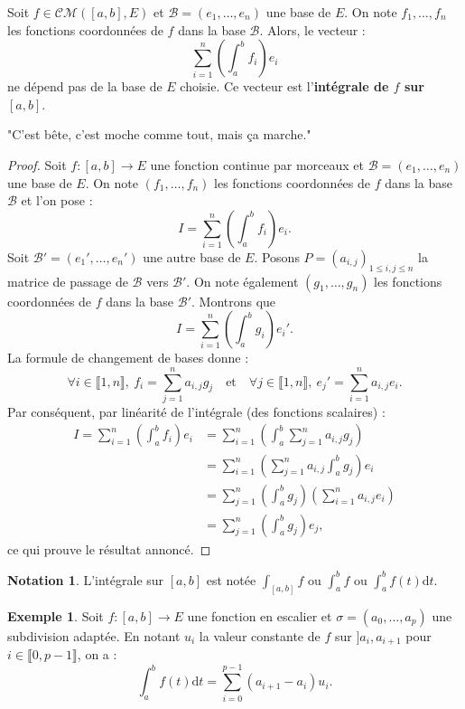 \documentclass[french]{article}
\renewcommand{\d}{\text{d}}
\theoremstyle{plain}
\theoremstyle{definition}
\newtheorem*{ex}{Exemple}
\newtheorem*{notation}{Notation}
\theoremstyle{remark}
\begin{document}
\begin{prop}%
	Soit $f\in\mathcal{CM}([a,b],E)$ et $\mathcal{B}=(e_1,\ldots,e_n)$ une base de $E$. On note $f_1,\ldots,f_n$ les fonctions coordonnées de $f$ dans la base $\mathcal{B}$. Alors, le vecteur :
	$$\sum_{i=1}^{n}\left(\int_{a}^{b}f_i\right)e_i$$ ne dépend pas de la base de $E$ choisie. Ce vecteur est l'\textbf{intégrale de $f$ sur $[a,b]$}.
\end{prop}
"C'est bête, c'est moche comme tout, mais ça marche."
\begin{proof}
	Soit $f:[a,b]\to E$ une fonction continue par morceaux et $\mathcal{B}=(e_1,\ldots,e_n)$ une base de $E$. On note $(f_1,\ldots,f_n)$ les fonctions coordonnées de $f$ dans la base $\mathcal{B}$ et l'on pose :
	$$I=\sum_{i=1}^{n}\left(\int_{a}^{b}f_i\right)e_i.$$
	Soit $\mathcal{B}'=(e_1',\ldots,e_n')$ une autre base de $E$. Posons $P=(a_{i,j})_{1\leqslant i,j\leqslant n}$ la matrice de passage de $\mathcal{B}$ vers $\mathcal{B}'$. On note également $(g_1,\ldots,g_n)$ les fonctions coordonnées de $f$ dans la base $\mathcal{B}'$. Montrons que $$I=\sum_{i=1}^{n}\left(\int_{a}^{b}g_i\right)e_i'.$$
	La formule de changement de bases donne :
	$$\forall i\in\llbracket1,n\rrbracket,\ f_i=\sum_{j=1}^{n}a_{i,j}g_j\quad\text{et}\quad\forall j\in\llbracket1,n\rrbracket,\ e_j'=\sum_{i=1}^{n}a_{i,j}e_i.$$
	Par conséquent, par linéarité de l'intégrale (des fonctions scalaires) :
	\begin{align*}
		I=\sum_{i=1}^{n}\left(\int_{a}^{b}f_i\right)e_i&=\sum_{i=1}^{n}\left(\int_{a}^{b}\sum_{j=1}^{n}a_{i,j}g_j\right)\\
		&=\sum_{i=1}^{n}\left(\sum_{j=1}^{n}a_{i,j}\int_{a}^{b}g_j\right)e_i\\
		&=\sum_{j=1}^{n}\left(\int_{a}^{b}g_j\right)\left(\sum_{i=1}^{n}a_{i,j}e_i\right)\\
		&=\sum_{j=1}^{n}\left(\int_{a}^{b}g_j\right)e_j,
	\end{align*}
	ce qui prouve le résultat annoncé.
\end{proof}

\begin{notation}
	L'intégrale sur $[a,b]$ est notée $\displaystyle\int_{[a,b]}f$ ou $\displaystyle\int_{a}^{b}f$ ou $\displaystyle\int_{a}^{b}f(t)\d t$.
\end{notation}

\begin{ex}
	Soit $f:[a,b]\to E$ une fonction en escalier et $\sigma=(a_0,\ldots,a_p)$ une subdivision adaptée. En notant $u_i$ la valeur constante de $f$ sur $]a_i,a_{i+1}$ pour $i\in\llbracket0,p-1\rrbracket$, on a :
	$$\int_{a}^{b}f(t)\d t=\sum_{i=0}^{p-1}(a_{i+1}-a_i)u_i.$$
\end{ex}
\end{document}
